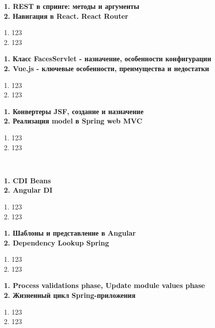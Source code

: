 \documentclass{article}
\newcommand{\bil}[4]{%
    \begin{minipage}{.3\textwidth}
        \textbf{1. #1} \\
        \textbf{2. #2}

        1. #3
        \\
        2. #4
    \end{minipage}
}
\begin{document}
\newpage
\bil{REST в спринге: методы и аргументы}{Навигация в React. React Router}{123}{123}
\hfill
\bil{Класс FacesServlet - назначение, особенности конфигурации}{Vue.js - ключевые особенности, преимущества и недостатки}{123}{123}
\hfill
\bil{Конвертеры JSF, создание и назначение}{Реализация model в Spring web MVC}{123}{123}
\\
\bil{CDI Beans }{Angular DI}{123}{123}
\hfill
\bil{Шаблоны и представление в Angular }{Dependency Lookup Spring}{123}{123}
\hfill
\bil{Process validations phase, Update module values phase}{Жизненный цикл Spring-приложения}{123}{123}
\end{document}
